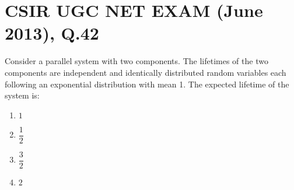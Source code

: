 \documentclass[journal,12pt,twocolumn]{IEEEtran}
\begin{document}
\section*{CSIR UGC NET EXAM (June 2013), Q.42}
Consider a parallel system with two components. The lifetimes of the two components are independent and identically distributed random variables each following an exponential distribution with mean 1. The expected lifetime of the system is:
\begin{enumerate}[label=\Alph*)]
    \item $1$\\[0.5pt]
    \item $\dfrac{1}{2}$\\
    \item $\dfrac{3}{2}$\\
    \item $2$
\end{enumerate}
\end{document}
